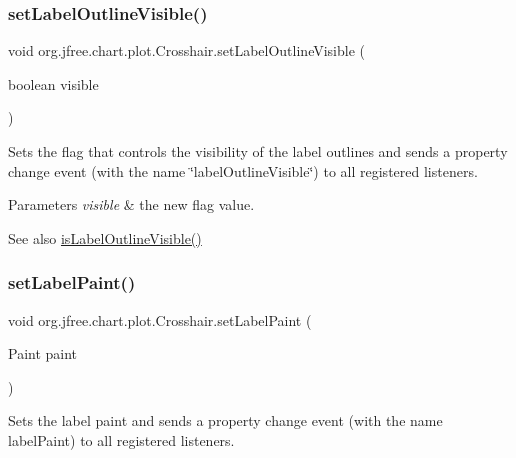 \subsubsection{\texorpdfstring{set\+Label\+Outline\+Visible()}{setLabelOutlineVisible()}}
{\footnotesize\ttfamily void org.\+jfree.\+chart.\+plot.\+Crosshair.\+set\+Label\+Outline\+Visible (\begin{DoxyParamCaption}\item[{boolean}]{visible }\end{DoxyParamCaption})}

Sets the flag that controls the visibility of the label outlines and sends a property change event (with the name \char`\"{}label\+Outline\+Visible\char`\"{}) to all registered listeners.


\begin{DoxyParams}{Parameters}
{\em visible} & the new flag value.\\
\hline
\end{DoxyParams}
\begin{DoxySeeAlso}{See also}
\mbox{\hyperlink{classorg_1_1jfree_1_1chart_1_1plot_1_1_crosshair_a92ee3a27945a3c6d16aee1431700b233}{is\+Label\+Outline\+Visible()}} 
\end{DoxySeeAlso}
\mbox{\label{classorg_1_1jfree_1_1chart_1_1plot_1_1_crosshair_ac77cfc040e23230a364d863fa3512ef1}} 
\subsubsection{\texorpdfstring{set\+Label\+Paint()}{setLabelPaint()}}
{\footnotesize\ttfamily void org.\+jfree.\+chart.\+plot.\+Crosshair.\+set\+Label\+Paint (\begin{DoxyParamCaption}\item[{Paint}]{paint }\end{DoxyParamCaption})}

Sets the label paint and sends a property change event (with the name \textquotesingle{}label\+Paint\textquotesingle{}) to all registered listeners.


